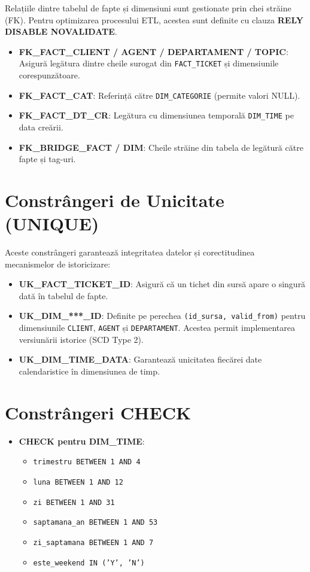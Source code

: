 Relațiile dintre tabelul de fapte și dimensiuni sunt gestionate prin chei străine (FK). Pentru optimizarea procesului ETL, acestea sunt definite cu clauza \textbf{RELY DISABLE NOVALIDATE}.

\begin{itemize}
    \item \textbf{FK\_FACT\_CLIENT / AGENT / DEPARTAMENT / TOPIC}: Asigură legătura dintre cheile surogat din \texttt{FACT\_TICKET} și dimensiunile corespunzătoare.
    \item \textbf{FK\_FACT\_CAT}: Referință către \texttt{DIM\_CATEGORIE} (permite valori NULL).
    \item \textbf{FK\_FACT\_DT\_CR}: Legătura cu dimensiunea temporală \texttt{DIM\_TIME} pe data creării.
    \item \textbf{FK\_BRIDGE\_FACT / DIM}: Cheile străine din tabela de legătură către fapte și tag-uri.
\end{itemize}

\section{Constrângeri de Unicitate (UNIQUE)}

Aceste constrângeri garantează integritatea datelor și corectitudinea mecanismelor de istoricizare:

\begin{itemize}
    \item \textbf{UK\_FACT\_TICKET\_ID}: Asigură că un tichet din sursă apare o singură dată în tabelul de fapte.
    \item \textbf{UK\_DIM\_***\_ID}: Definite pe perechea \texttt{(id\_sursa, valid\_from)} pentru dimensiunile \texttt{CLIENT}, \texttt{AGENT} și \texttt{DEPARTAMENT}. Acestea permit implementarea versiunării istorice (SCD Type 2).
    \item \textbf{UK\_DIM\_TIME\_DATA}: Garantează unicitatea fiecărei date calendaristice în dimensiunea de timp.
\end{itemize}

\section{Constrângeri CHECK}

\begin{itemize}
    \item \textbf{CHECK pentru DIM\_TIME}:
    \begin{itemize}
        \item \texttt{trimestru BETWEEN 1 AND 4}
        \item \texttt{luna BETWEEN 1 AND 12}
        \item \texttt{zi BETWEEN 1 AND 31}
        \item \texttt{saptamana\_an BETWEEN 1 AND 53}
        \item \texttt{zi\_saptamana BETWEEN 1 AND 7}
        \item \texttt{este\_weekend IN ('Y', 'N')}
    \end{itemize}
\end{itemize}

